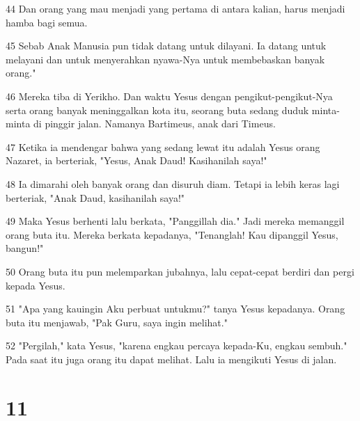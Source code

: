 \par 44 Dan orang yang mau menjadi yang pertama di antara kalian, harus menjadi hamba bagi semua.
\par 45 Sebab Anak Manusia pun tidak datang untuk dilayani. Ia datang untuk melayani dan untuk menyerahkan nyawa-Nya untuk membebaskan banyak orang."
\par 46 Mereka tiba di Yerikho. Dan waktu Yesus dengan pengikut-pengikut-Nya serta orang banyak meninggalkan kota itu, seorang buta sedang duduk minta-minta di pinggir jalan. Namanya Bartimeus, anak dari Timeus.
\par 47 Ketika ia mendengar bahwa yang sedang lewat itu adalah Yesus orang Nazaret, ia berteriak, "Yesus, Anak Daud! Kasihanilah saya!"
\par 48 Ia dimarahi oleh banyak orang dan disuruh diam. Tetapi ia lebih keras lagi berteriak, "Anak Daud, kasihanilah saya!"
\par 49 Maka Yesus berhenti lalu berkata, "Panggillah dia." Jadi mereka memanggil orang buta itu. Mereka berkata kepadanya, "Tenanglah! Kau dipanggil Yesus, bangun!"
\par 50 Orang buta itu pun melemparkan jubahnya, lalu cepat-cepat berdiri dan pergi kepada Yesus.
\par 51 "Apa yang kauingin Aku perbuat untukmu?" tanya Yesus kepadanya. Orang buta itu menjawab, "Pak Guru, saya ingin melihat."
\par 52 "Pergilah," kata Yesus, "karena engkau percaya kepada-Ku, engkau sembuh." Pada saat itu juga orang itu dapat melihat. Lalu ia mengikuti Yesus di jalan.

\chapter{11}

